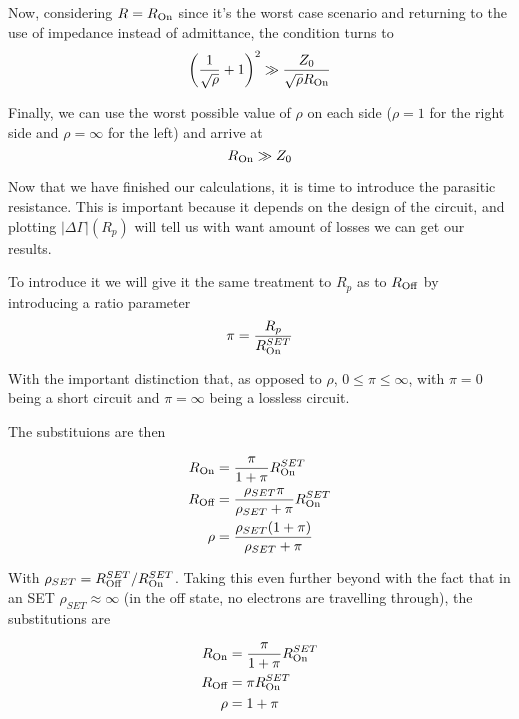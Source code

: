 \documentclass[../main.tex]{subfiles}
\begin{document}
Now, considering \(R = R_{\text{On}}\) since it's the worst case scenario and
returning to the use of impedance instead of admittance, the condition turns to
\begin{equation*}
\label{eq:ProtoOptParallelContrApprox}
    \left(\frac{1}{\sqrt\rho} + 1\right)^2 \gg
    \frac{Z_{0}}{\sqrt\rho R_{\text{On}}}
\end{equation*}

Finally, we can use the worst possible value of \(\rho\) on each side
(\(\rho = 1\) for the right side and \(\rho = \infty\) for the left) and
arrive at
\begin{equation}
\label{eq:OptParallelContrApprox}
    R_{\text{On}} \gg Z_{0}
\end{equation}

Now that we have finished our calculations, it is time to introduce the
parasitic resistance. This is important because it depends on the design of
the circuit, and plotting \(|\Delta\Gamma|(R_{p})\) will tell us with want
amount of losses we can get our results.

To introduce it we will give it the same treatment to \(R_{p}\) as to
\(R_{\text{Off}}\) by introducing a ratio parameter
\begin{equation*}
\label{eq:PiDef}
    \pi = \frac{R_{p}}{R_{\text{On}}^{SET}}
\end{equation*}

With the important distinction that, as opposed to \(\rho\), \(0\leq\pi\leq\infty\),
with \(\pi = 0\) being a short circuit and \(\pi = \infty\)
being a lossless circuit.

The substituions are then

\begin{align*}
    R_{\text{On}}
    &= \frac{\pi}{1 + \pi} R_{\text{On}}^{SET}\\
    R_{\text{Off}}
    &= \frac{\rho_{SET}\pi}{\rho_{SET} + \pi}R_{\text{On}}^{SET}\\
    \rho
    &= \frac{\rho_{SET}(1 + \pi)}{\rho_{SET} + \pi}
\end{align*}

With \(\rho_{SET} = R_{\text{Off}}^{SET}/R_{\text{On}}^{SET}\). Taking this even further beyond
with the fact that in an SET \(\rho_{SET} \approx \infty\)
(in the off state, no electrons are travelling through), the substitutions are

\begin{align*}
    R_{\text{On}}
    &= \frac{\pi}{1 + \pi} R_{\text{On}}^{SET}\\
    R_{\text{Off}}
    &= \pi R_{\text{On}}^{SET}\\
    \rho
    &= 1 + \pi
\end{align*}
\end{document}
